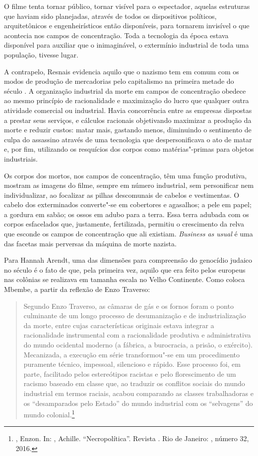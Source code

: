O filme tenta tornar público, tornar visível para o espectador, aquelas
estruturas que haviam sido planejadas, através de todos os dispositivos
políticos, arquitetônicos e engenheirísticos então disponíveis, para
tornarem invisível o que acontecia nos campos de concentração. Toda a
tecnologia da época estava disponível para auxiliar que o inimaginável,
o extermínio industrial de toda uma população, tivesse lugar.

A contrapelo, Resnais evidencia aquilo que o nazismo tem
em comum com os modos de produção de mercadorias pelo capitalismo na
primeira metade do século . A organização industrial da morte em
campos de concentração obedece ao mesmo princípio de racionalidade e
maximização do lucro que qualquer outra atividade comercial ou
industrial. Havia concorrência entre as empresas dispostas a prestar
seus serviços, e cálculos racionais objetivando maximizar a produção da
morte e reduzir custos: matar mais, gastando menos, diminuindo o
sentimento de culpa do assassino através de uma tecnologia que
despersonificava o ato de matar e, por fim, utilizando os resquícios dos
corpos como matérias"-primas para objetos industriais.

Os corpos dos
mortos, nos campos de concentração, têm uma função produtiva, mostram as
imagens do filme, sempre em número industrial, sem personificar nem
individualizar, ao focalizar as pilhas descomunais de cabelos e
vestimentas. O cabelo dos exterminados converte"-se em cobertores e
agasalhos; a pele em papel; a gordura em sabão; os ossos em adubo para a
terra. Essa terra adubada com os corpos esfacelados que, justamente,
fertilizada, permitiu o crescimento da relva que esconde os campos de
concentração que ali existiam. \emph{Business as usual} é uma das
facetas mais perversas da máquina de morte nazista.

Para Hannah Arendt, uma das dimensões para compreensão do genocídio
judaico no século  é o fato de que, pela primeira vez, aquilo que era
feito pelos europeus nas colônias se realizava em tamanha escala no
Velho Continente. Como coloca Mbembe, a partir da reflexão de Enzo
Traverso:

\begin{quote}
Segundo Enzo Traverso, as câmaras de gás e os fornos foram o ponto
culminante de um longo processo de desumanização e de industrialização
da morte, entre cujas características originais estava integrar a
racionalidade instrumental com a racionalidade produtiva e
administrativa do mundo ocidental moderno (a fábrica, a burocracia, a
prisão, o exército). Mecanizada, a execução em série transformou"-se em
um procedimento puramente técnico, impessoal, silencioso e rápido. Esse
processo foi, em parte, facilitado pelos estereótipos racistas e pelo
florescimento de um racismo baseado em classe que, ao traduzir os
conflitos sociais do mundo industrial em termos raciais, acabou
comparando as classes trabalhadoras e os ``desamparados pelo Estado'' do
mundo industrial com os ``selvagens'' do mundo colonial.\footnote{, Enzon. In: ,
  Achille. ``Necropolítica''. Revista {}. Rio de Janeiro:
  , número 32, 2016.}
\end{quote}


